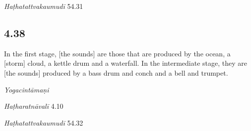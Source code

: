 \begin{ekdosis}
\begin{testimonia}[hp04_037]
\emph{Haṭhatattvakaumudī} 54.31
\begin{versinnote}
\end{versinnote}
\end{testimonia}


\subsection*{4.38}
\begin{translation}[hp04_038]
In the first stage, [the sounds] are those that are produced by the ocean, a [storm] cloud, a kettle drum and a waterfall. In the intermediate stage, they are [the sounds] produced by a bass drum and conch and a bell and trumpet.
\end{translation}


\begin{testimonia}[hp04_038]
\emph{Yogacintāmaṇi}
\begin{versinnote}
\end{versinnote}

\emph{Haṭharatnāvalī} 4.10
\begin{versinnote}
\end{versinnote}

\emph{Haṭhatattvakaumudī} 54.32
\begin{versinnote}
\end{versinnote}
\end{testimonia}


\end{ekdosis}
